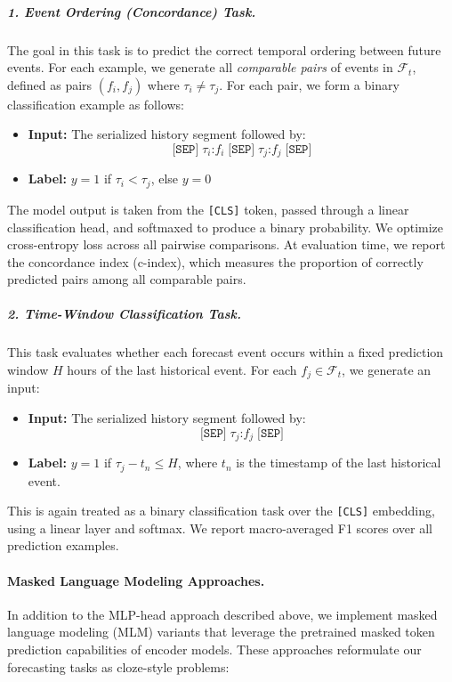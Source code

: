 \subparagraph{1. Event Ordering (Concordance) Task.}
The goal in this task is to predict the correct temporal ordering between future events. 
For each example, we generate all \emph{comparable pairs} of events in $\mathcal{F}_t$, defined as pairs $(f_i, f_j)$ where $\tau_i \neq \tau_j$. 
For each pair, we form a binary classification example as follows:

\begin{itemize}
    \item \textbf{Input:} The serialized history segment followed by:
    \begin{equation}
        \texttt{[SEP]} \; \tau_i\texttt{:}f_i \; \texttt{[SEP]} \; \tau_j\texttt{:}f_j \; \texttt{[SEP]}
    \end{equation}
    \item \textbf{Label:} $y = 1$ if $\tau_i < \tau_j$, else $y = 0$
\end{itemize}

The model output is taken from the \texttt{[CLS]} token, passed through a linear classification head, and softmaxed to produce a binary probability. 
We optimize cross-entropy loss across all pairwise comparisons. 
At evaluation time, we report the concordance index (c-index), which measures the proportion of correctly predicted pairs among all comparable pairs.

\subparagraph{2. Time-Window Classification Task.}
This task evaluates whether each forecast event occurs within a fixed prediction window $H$ hours of the last historical event. 
For each $f_j \in \mathcal{F}_t$, we generate an input:

\begin{itemize}
    \item \textbf{Input:} The serialized history segment followed by:
    \begin{equation}
        \texttt{[SEP]} \; \tau_j\texttt{:}f_j \; \texttt{[SEP]}
    \end{equation}
    \item \textbf{Label:} $y = 1$ if $\tau_j - t_n \leq H$, where $t_n$ is the timestamp of the last historical event.
\end{itemize}

This is again treated as a binary classification task over the \texttt{[CLS]} embedding, using a linear layer and softmax. 
We report macro-averaged F1 scores over all prediction examples.

\paragraph{Masked Language Modeling Approaches.}
In addition to the MLP-head approach described above, we implement masked language modeling (MLM) variants that leverage the pretrained masked token prediction capabilities of encoder models. These approaches reformulate our forecasting tasks as cloze-style problems:

